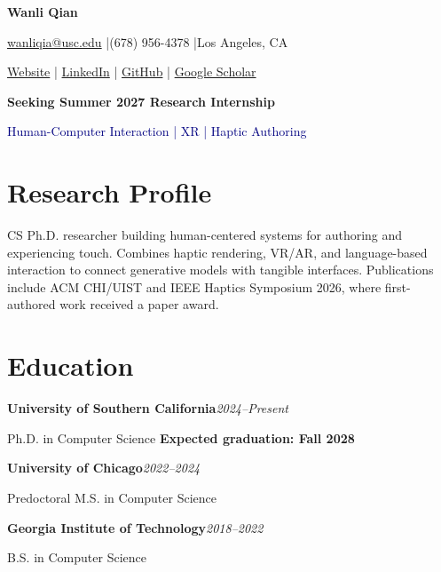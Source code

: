\documentclass[11pt,letterpaper]{article}
\newcommand{\role}[2]{\textbf{#1}\hfill\textit{#2}\par}
\begin{document}
\fontsize{10.5}{12.4}\selectfont
{\fontsize{24}{27}\selectfont\textbf{Wanli Qian}}\par
\vspace{3pt}
\href{mailto:wanliqia@usc.edu}{wanliqia@usc.edu} \enspace|\enspace (678) 956-4378 \enspace|\enspace Los Angeles, CA\par
\href{https://silverwings-zero.github.io/}{Website} \enspace|\enspace
\href{https://www.linkedin.com/in/wanli-qian-7bb399192/}{LinkedIn} \enspace|\enspace
\href{https://github.com/silverwings-zero}{GitHub} \enspace|\enspace
\href{https://scholar.google.com/citations?user=azFoAIkAAAAJ&hl=en}{Google Scholar}\par
\vspace{4pt}
\textbf{Seeking Summer 2027 Research Internship}\par
\textcolor{navy}{Human-Computer Interaction | XR | Haptic Authoring}\par
\section*{Research Profile}
CS Ph.D. researcher building human-centered systems for authoring and experiencing touch. Combines haptic rendering, VR/AR, and language-based interaction to connect generative models with tangible interfaces. Publications include ACM CHI/UIST and IEEE Haptics Symposium 2026, where first-authored work received a paper award.\par

\section*{Education}
\role{University of Southern California}{2024--Present}
Ph.D. in Computer Science \hfill \textbf{Expected graduation: Fall 2028}\par
\vspace{3pt}
\role{University of Chicago}{2022--2024}
Predoctoral M.S. in Computer Science\par
\vspace{3pt}
\role{Georgia Institute of Technology}{2018--2022}
B.S. in Computer Science\par
\end{document}
